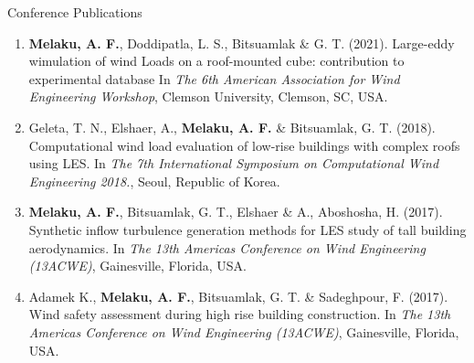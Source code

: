 \documentclass{resume} %
\begin{document}
\begin{rSection}{Conference Publications}
\begin{enumerate}


\item {\bf Melaku, A. F.}, Doddipatla, L. S., Bitsuamlak \& G. T. (2021). Large-eddy wimulation of wind Loads on a roof-mounted cube: contribution to experimental database  In \emph{The 6th American Association for Wind Engineering Workshop}, Clemson University, Clemson, SC, USA.

\item Geleta, T. N., Elshaer, A., {\bf Melaku, A. F.} \& Bitsuamlak, G. T. (2018). Computational wind load evaluation of low-rise buildings with complex roofs using LES. In \emph{The 7th International Symposium on Computational Wind Engineering 2018.}, Seoul, Republic of Korea.  

\item {\bf Melaku, A. F.}, Bitsuamlak, G. T., Elshaer \& A., Aboshosha, H. (2017). Synthetic inflow turbulence generation methods for LES study of tall building aerodynamics. In \emph{The 13th Americas Conference on Wind Engineering (13ACWE)}, Gainesville, Florida, USA.  

\item  Adamek K., {\bf Melaku, A. F.}, Bitsuamlak, G. T. \& Sadeghpour, F. (2017). Wind safety assessment during high rise building construction. In \emph{The 13th Americas Conference on Wind Engineering (13ACWE)}, Gainesville, Florida, USA.  

\end{enumerate}
\end{rSection}





\end{document}
